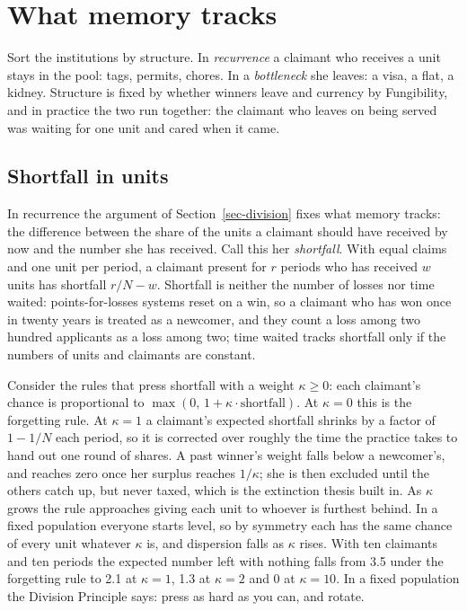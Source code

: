 \documentclass[
  11pt,
  letterpaper,
  DIV=11,
  numbers=noendperiod,
  twoside]{scrartcl}
\begin{document}
\section{What memory tracks}\label{sec-proportion}

Sort the institutions by structure. In \emph{recurrence} a claimant who
receives a unit stays in the pool: tags, permits, chores. In a
\emph{bottleneck} she leaves: a visa, a flat, a kidney. Structure is
fixed by whether winners leave and currency by Fungibility, and in
practice the two run together: the claimant who leaves on being served
was waiting for one unit and cared when it came.

\subsection{Shortfall in units}\label{shortfall-in-units}

In recurrence the argument of Section~\ref{sec-division} fixes what
memory tracks: the difference between the share of the units a claimant
should have received by now and the number she has received. Call this
her \emph{shortfall}. With equal claims and one unit per period, a
claimant present for \(r\) periods who has received \(w\) units has
shortfall \(r/N - w\). Shortfall is neither the number of losses nor
time waited: points-for-losses systems reset on a win, so a claimant who
has won once in twenty years is treated as a newcomer, and they count a
loss among two hundred applicants as a loss among two; time waited
tracks shortfall only if the numbers of units and claimants are
constant.

Consider the rules that press shortfall with a weight \(\kappa \geq 0\):
each claimant's chance is proportional to
\(\max(0,\, 1 + \kappa \cdot \text{shortfall})\). At \(\kappa = 0\) this
is the forgetting rule. At \(\kappa = 1\) a claimant's expected
shortfall shrinks by a factor of \(1 - 1/N\) each period, so it is
corrected over roughly the time the practice takes to hand out one round
of shares. A past winner's weight falls below a newcomer's, and reaches
zero once her surplus reaches \(1/\kappa\); she is then excluded until
the others catch up, but never taxed, which is the extinction thesis
built in. As \(\kappa\) grows the rule approaches giving each unit to
whoever is furthest behind. In a fixed population everyone starts level,
so by symmetry each has the same chance of every unit whatever
\(\kappa\) is, and dispersion falls as \(\kappa\) rises. With ten
claimants and ten periods the expected number left with nothing falls
from 3.5 under the forgetting rule to 2.1 at \(\kappa = 1\), 1.3 at
\(\kappa = 2\) and 0 at \(\kappa = 10\). In a fixed population the
Division Principle says: press as hard as you can, and rotate.
\end{document}
